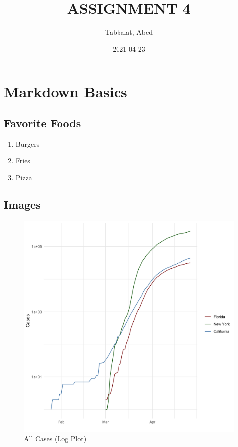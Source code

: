 \documentclass[
]{article}
\title{ASSIGNMENT 4}
\author{Tabbalat, Abed}
\date{2021-04-23}
\providecommand{\tightlist}{%
  \setlength{\itemsep}{0pt}\setlength{\parskip}{0pt}}
\begin{document}
\maketitle

\hypertarget{markdown-basics}{%
\section{Markdown Basics}\label{markdown-basics}}

\hypertarget{favorite-foods}{%
\subsection{Favorite Foods}\label{favorite-foods}}

\begin{enumerate}
\def\labelenumi{\arabic{enumi}.}
\tightlist
\item
  Burgers
\item
  Fries
\item
  Pizza
\end{enumerate}

\hypertarget{images}{%
\subsection{Images}\label{images}}

\begin{figure}
\centering
\includegraphics{10-all-cases-log.png}
\caption{All Cases (Log Plot)}
\end{figure}
\end{document}
